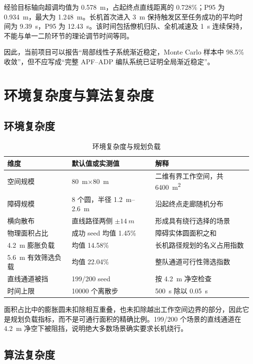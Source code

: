 \documentclass[UTF8,a4paper,12pt,fontset=windows]{ctexart}
\begin{document}
经验目标轴向超调均值为 \SI{0.578}{m}，占起终点直线距离的 0.728\%；P95 为 \SI{0.934}{m}，最大为 \SI{1.248}{m}。长机首次进入 \SI{3}{m} 保持触发区至任务成功的平均时间为 \SI{9.39}{s}，P95 为 \SI{12.43}{s}。该时间包括僚机归队、全机减速及 \SI{1}{s} 连续保持，不能与单一二阶环节的理论调节时间等同。

因此，当前项目可以报告“局部线性子系统渐近稳定，Monte Carlo 样本中 98.5\% 收敛”，但不应写成“完整 APF--ADP 编队系统已证明全局渐近稳定”。

\section{环境复杂度与算法复杂度}

\subsection{环境复杂度}

\begin{table}[H]
\centering
\caption{环境复杂度与规划负载}
\label{tab:environment}
\begin{tabularx}{0.95\textwidth}{@{}lC{4.2cm}Y@{}}
\toprule
维度 & 默认值或实测值 & 解释 \\
\midrule
空间规模 & \SI{80}{m}$\times$\SI{80}{m} & 二维有界工作空间，共 \SI{6400}{m^2} \\
障碍规模 & 8 个圆，半径 \SIrange{1.2}{2.6}{m} & 沿起终点走廊随机分布 \\
横向散布 & 直线路径两侧 $\pm\SI{14}{m}$ & 形成具有绕行选择的场景 \\
物理面积占比 & 成功 seed 均值 1.45\% & 障碍实体圆面积之和 \\
\SI{4.2}{m} 膨胀负载 & 均值 14.58\% & 长机路径规划的名义占用指数 \\
\SI{5.6}{m} 有效筛选负载 & 均值 22.04\% & 整队通道可行性筛选指数 \\
直线通道被挡 & 199/200 seed & 按 \SI{4.2}{m} 净空检查 \\
时间上限 & 10000 个离散步 & \SI{500}{s} 除以 \SI{0.05}{s} \\
\bottomrule
\end{tabularx}
\end{table}

面积占比中的膨胀圆未扣除相互重叠，也未扣除越出工作空间边界的部分，因此它是规划负载指标，而不是可通行面积的精确比例。199/200 个场景的直线通道在 \SI{4.2}{m} 净空下被阻挡，说明绝大多数场景确实要求长机绕行。

\subsection{算法复杂度}
\end{document}
